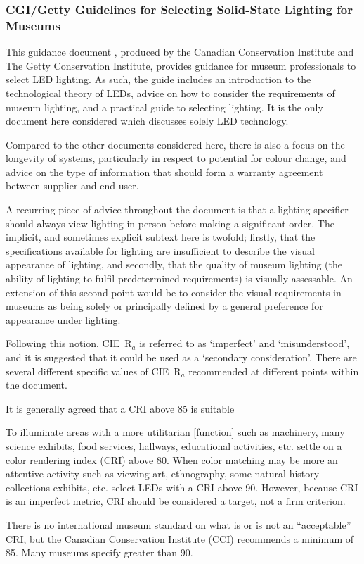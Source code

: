 \subsubsection{CGI/Getty Guidelines for Selecting Solid-State Lighting for Museums}

This guidance document \citep{druzik_guidelines_2012}, produced by the Canadian Conservation Institute and The Getty Conservation Institute, provides guidance for museum professionals to select \gls{LED} lighting. As such, the guide includes an introduction to the technological theory of \glspl{LED}, advice on how to consider the requirements of museum lighting, and a practical guide to selecting lighting. It is the only document here considered which discusses solely LED technology.

Compared to the other documents considered here, there is also a focus on the longevity of systems, particularly in respect to potential for colour change, and advice on the type of information that should form a warranty agreement between supplier and end user.

A recurring piece of advice throughout the document is that a lighting specifier should always view lighting in person before making a significant order. The implicit, and sometimes explicit subtext here is twofold; firstly, that the specifications available for lighting are insufficient to describe the visual appearance of lighting, and secondly, that the quality of museum lighting (the ability of lighting to fulfil predetermined requirements) is visually assessable. An extension of this second point would be to consider the visual requirements in museums as being solely or principally defined by a general preference for appearance under lighting.

Following this notion, \gls{CIE}~R$_a$ is referred to as `imperfect' and `misunderstood', and it is suggested that it could be used as a `secondary consideration'. There are several different specific values of \gls{CIE}~R$_a$ recommended at different points within the document.

\begin{itquote}{}
It is generally agreed that a \gls{CRI} above 85 is suitable
\end{itquote}
\begin{itquote}{}
To illuminate areas with a more utilitarian [function] such as machinery, many science exhibits, food services, hallways, educational activities, etc. settle on a color rendering index (\gls{CRI}) above 80. When color matching may be more an attentive activity such as viewing art, ethnography, some natural history collections exhibits, etc. select \glspl{LED} with a \gls{CRI} above 90. However, because \gls{CRI} is an imperfect metric, \gls{CRI} should be considered a target, not a firm criterion.
\end{itquote}
\begin{itquote}{}
There is no international museum standard on what is or is not an ``acceptable'' \gls{CRI}, but the Canadian Conservation Institute (CCI) recommends a minimum of 85. Many museums specify greater than 90.
\end{itquote}

